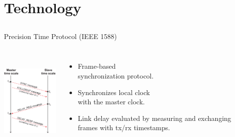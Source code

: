 \documentclass[compress, red]{beamer}
\begin{document}
\section{Technology}
\subsection{}

\begin{frame}{Precision Time Protocol (IEEE 1588)}

\begin{columns}[c]
  \column{1.5in}
      \begin{center}
	\includegraphics[height=5cm]{protocol/ptp_exchange.pdf}
      \end{center}
  \column{2.5in}
      \begin{itemize}
	  \item Frame-based \\ synchronization protocol.
	  \item Synchronizes local clock \\ with the master clock.
	  \item Link delay evaluated by measuring and exchanging
            frames with tx/rx timestamps.
      \end{itemize}
  \end{columns}
\end{frame}
\end{document}
